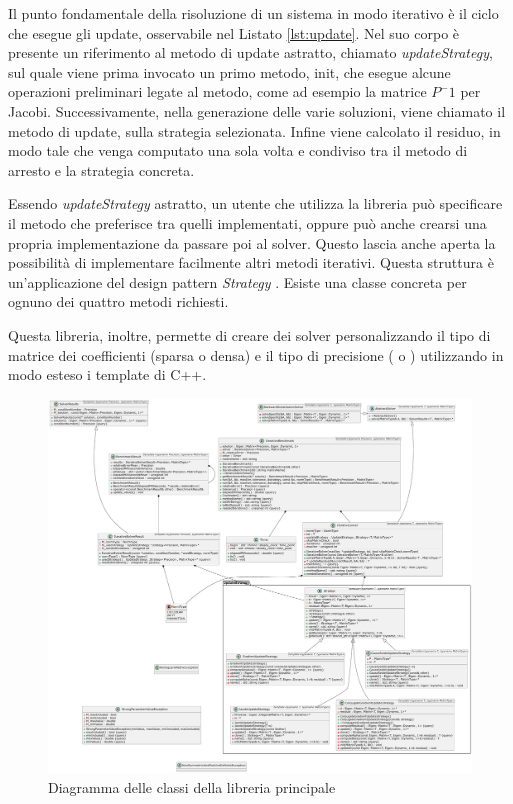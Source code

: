Il punto fondamentale della risoluzione di un sistema in modo iterativo è il ciclo che esegue gli update, osservabile nel Listato \ref{lst:update}. Nel suo corpo è presente un riferimento al metodo di update astratto, chiamato \textit{updateStrategy}, sul quale viene prima invocato un primo metodo, init, che esegue alcune operazioni preliminari legate al metodo, come ad esempio la matrice $P^-1$ per Jacobi. Successivamente, nella generazione delle varie soluzioni, viene chiamato il metodo di update, sulla strategia selezionata. Infine viene calcolato il residuo, in modo tale che venga computato una sola volta e condiviso tra il metodo di arresto e la strategia concreta.

Essendo \textit{updateStrategy} astratto, un utente che utilizza la libreria può specificare il metodo che preferisce tra quelli implementati, oppure può anche crearsi una propria implementazione da passare poi al solver. Questo lascia anche aperta la possibilità di implementare facilmente altri metodi iterativi. Questa struttura è un'applicazione del design pattern \textit{Strategy} \cite{Strategy}. Esiste una classe concreta per ognuno dei quattro metodi richiesti.




Questa libreria, inoltre, permette di creare dei solver personalizzando il tipo di matrice dei coefficienti (sparsa o densa) e il tipo di precisione ( o ) utilizzando in modo esteso i template di C++.

\begin{figure}
	\centering
	\includegraphics[width=\textwidth]{figures/libDiagram.pdf}
	\caption{Diagramma delle classi della libreria principale}
	\label{fig:libdiagram}
\end{figure}

